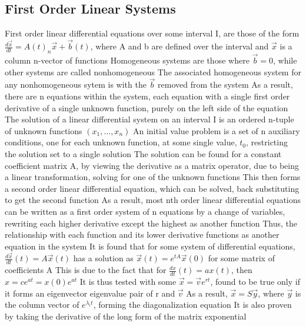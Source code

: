 \documentclass[11 pt, twoside]{article}
\newenvironment{outline*}
{
	\begin{outline}[enumerate]
	}
	{\end{outline}
}
\begin{document}
\subsection{First Order Linear Systems}
\begin{outline*}
\1 First order linear differential equations over some interval I, are those of the form $\frac{d\vec{x}}{dt} = A(t)_n\vec{x} + \vec{b}(t)$, where A and b are defined over the interval and $\vec{x}$ is a column n-vector of functions
\2 Homogeneous systems are those where $\vec{b} = 0$, while other systems are called nonhomogeneous
\3 The associated homogeneous system for any nonhomogeneous sytem is with the $\vec{b}$ removed from the system
\2 As a result, there are n equations within the system, each equation with a single first order derivative of a single unknown function, purely on the left side of the equation
\1 The solution of a linear differential system on an interval I is an ordered n-tuple of unknown functions $(x_1, \dots, x_n)$
\2 An initial value problem is a set of n auxiliary conditions, one for each unknown function, at some single value, $t_0$, restricting the solution set to a single solution
\1 The solution can be found for a constant coefficient matrix A, by viewing the derivative as a matrix operator, due to being a linear transformation, solving for one of the unknown functions
\2 This then forms a second order linear differential equation, which can be solved, back substituting to get the second function
\2 As a result, most nth order linear differential equations can be written as a first order system of n equations by a change of variables, rewriting each higher derivative except the highest as another function
\3 Thus, the relationship with each function and its lower derivative functions as another equation in the system
\1 It is found that for some system of differential equations, $\frac{d\vec{x}}{dt}(t) = A\vec{x}(t)$ has a solution as $\vec{x}(t) = e^{tA}\vec{x}(0)$ for some matrix of coefficients A
\2 This is due to the fact that for $\frac{dx}{dt}(t) = ax(t)$, then $x = ce^{at} = x(0)e^{at}$
\3 It is thus tested with some $\vec{x} = \vec{v}e^{rt}$, found to be true only if it forms an eigenvector eigenvalue pair of r and $\vec{v}$
\3 As a result, $\vec{x} = S\vec{y}$, where $\vec{y}$ is the column vector of $e^{\lambda_i t}$, forming the diagonalization equation
\2 It is also proven by taking the derivative of the long form of the matrix exponential
\end{outline*}
\end{document}
